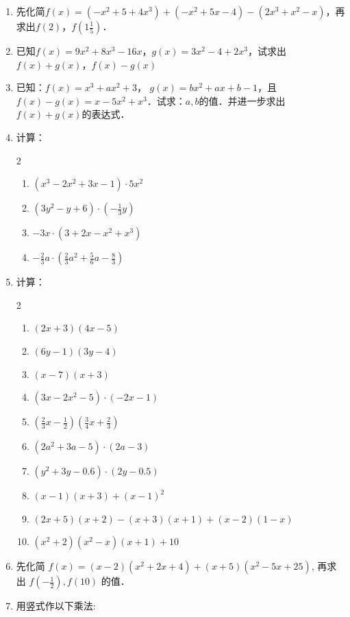 \begin{enumerate}
\item 先化简$f(x)=(-x^2+5+4x^3)+(-x^2+5x-4)-(2x^3+x^2-x)$，再求出$f(2)$，$f\left(1\frac{1}{5}\right)$．
\item 已知$f(x)=9x^2+8x^3-16x$，$g(x)=3x^2-4+2x^3$，试求出$f(x)+g(x)$，$f(x)-g(x)$
\item 已知：$f(x)=x^3+ax^2+3$， $g(x)=bx^2+ax+b-1$，且$f(x)-g(x)=x-5x^2+x^3$．试求：$a,b$的值．并进一步求出$f(x)+g(x)$的表达式．
\item 计算：
\begin{multicols}{2}
\begin{enumerate}
    \item $(x^3-2x^2+3x-1)\cdot 5x^2$
    \item $(3y^2-y+6)\cdot \left(-\frac{1}{3}y\right)$
    \item $-3x\cdot (3+2x-x^2+x^3)$
    \item $-\frac{2}{3}a\cdot \left(\frac{2}{3}a^2+\frac{5}{6}a-\frac{8}{3}\right)$
\end{enumerate}
    \end{multicols}

\item 计算：
\begin{multicols}{2}
    \begin{enumerate}
        \item $(2x+3)(4x-5)$
        \item $(6y-1)(3y-4)$
        \item $(x-7)(x+3)$
        \item $(3x-2x^2-5)\cdot (-2x-1)$
        \item $\left(\frac{2}{3} x-\frac{1}{2}\right)\left(\frac{3}{4} x+\frac{2}{3}\right)$
        \item $\left(2 a^{2}+3a-5\right) \cdot(2a-3)$
        \item $\left(y^{2}+3y-0.6\right) \cdot(2y-0.5)$
        \item $(x-1)(x+3)+(x-1)^{2}$
        \item $(2x+5)(x+2)-(x+3)(x+1)+(x-2)(1-x)$
        \item $\left(x^{2}+2\right)\left(x^{2}-x\right)(x+1)+10$
    \end{enumerate}
\end{multicols}


\item 先化简 $f(x)=(x-2)\left(x^{2}+2 x+4\right)+(x+5)(x^{2}-5 x+25)$, 再求出 $f\left(-\frac{1}{2}\right), f(10)$ 的值．
\item 用竖式作以下乘法:
\begin{enumerate}
\end{enumerate}


\end{enumerate}
